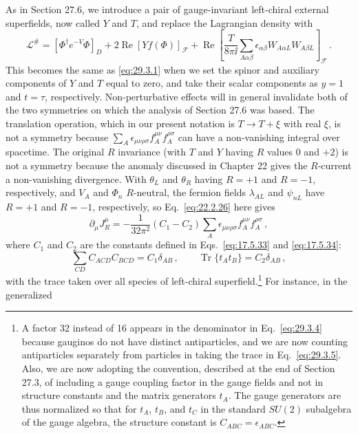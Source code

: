 As in Section 27.6, we introduce a pair of gauge-invariant left-chiral
external superfields, now called \(Y\) and \(T\), and replace the
Lagrangian density with
\begin{equation}
  \mathcal{L}^{\#}
  =
  \left[\Phi^\dagger e^{-V}\Phi\right]_D
  +2\operatorname{Re}\left[Yf(\Phi)\right]_{\mathcal{F}}
  +\operatorname{Re}
  \left[
    \frac{T}{8\pi \ii}
    \sum_{A\alpha\beta}
    \epsilon_{\alpha\beta}W_{A\alpha L}W_{A\beta L}
  \right]_{\mathcal{F}}\,.
  \tag{29.3.3}\label{eq:29.3.3}
\end{equation}
This becomes the same as \eqref{eq:29.3.1} when we set the spinor and
auxiliary components of \(Y\) and \(T\) equal to zero, and take their
scalar components as \(y=1\) and \(t=\tau\), respectively.
Non-perturbative effects will in general invalidate both of the two
symmetries on which the analysis of Section 27.6 was based. The translation
operation, which in our present notation is \(T\longrightarrow T+\xi\)
with real \(\xi\), is not a symmetry because
\(\sum_A\epsilon_{\mu\nu\rho\sigma}f_A^{\mu\nu}f_A^{\rho\sigma}\) can
have a non-vanishing integral over spacetime. The original \(R\) invariance
(with \(T\) and \(Y\) having \(R\) values 0 and \(+2\)) is not a symmetry
because the anomaly discussed in Chapter 22 gives the \(R\)-current a
non-vanishing divergence. With \(\theta_L\) and \(\theta_R\) having
\(R=+1\) and \(R=-1\), respectively, and \(V_A\) and \(\Phi_n\)
\(R\)-neutral, the fermion fields \(\lambda_{AL}\) and \(\psi_{nL}\)
have \(R=+1\) and \(R=-1\), respectively, so Eq.~\eqref{eq:22.2.26}
here gives
\begin{equation}
  \partial_\mu J_R^\mu
  =
  -\frac{1}{32\pi^2}(C_1-C_2)
  \sum_A\epsilon_{\mu\nu\rho\sigma}
  f_A^{\mu\nu}f_A^{\rho\sigma}\,,
  \tag{29.3.4}\label{eq:29.3.4}
\end{equation}
where \(C_1\) and \(C_2\) are the constants defined in
Eqs.~\eqref{eq:17.5.33} and \eqref{eq:17.5.34}:
\begin{equation}
  \sum_{CD}C_{ACD}C_{BCD}=C_1\delta_{AB}\,,
  \qquad
  \operatorname{Tr}\{t_A t_B\}=C_2\delta_{AB}\,,
  \tag{29.3.5}\label{eq:29.3.5}
\end{equation}
with the trace taken over all species of left-chiral
superfield.\footnote{A factor 32 instead of 16 appears in the denominator
in Eq.~\eqref{eq:29.3.4} because gauginos do not have distinct
antiparticles, and we are now counting antiparticles separately from
particles in taking the trace in Eq.~\eqref{eq:29.3.5}. Also, we are now
adopting the convention, described at the end of Section 27.3, of including
a gauge coupling factor in the gauge fields and not in structure constants
and the matrix generators \(t_A\). The gauge generators are thus normalized
so that for \(t_A\), \(t_B\), and \(t_C\) in the standard \(SU(2)\)
subalgebra of the gauge algebra, the structure constant is
\(C_{ABC}=\epsilon_{ABC}\).} For instance, in the generalized
